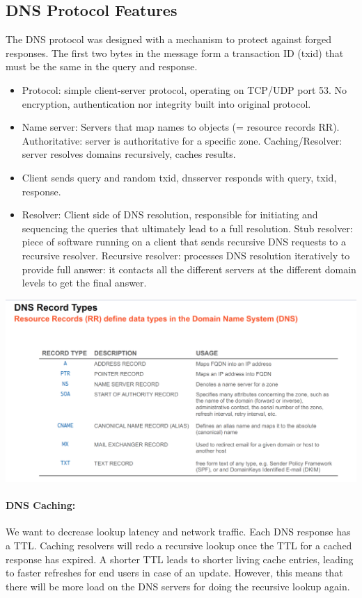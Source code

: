 \subsection{DNS Protocol Features}
The DNS protocol was designed with a mechanism to protect against forged responses. The first two bytes in the message form a transaction ID (txid) that must be the same in the query and response.

\begin{itemize}
	\item Protocol: simple client-server protocol, operating on TCP/UDP port 53. No encryption, authentication nor integrity built into original protocol.
	\item Name server: Servers that map names to objects (= resource records RR). Authoritative: server is authoritative for a specific zone. Caching/Resolver: server resolves domains recursively, caches results.
	\item Client sends query and random txid, dnsserver responds with query, txid, response.
	\item Resolver: Client side of DNS resolution, responsible for initiating and sequencing the queries that ultimately lead to a full resolution. Stub resolver: piece of software running on a client that sends recursive DNS requests to a recursive resolver. Recursive resolver: processes DNS resolution iteratively to	provide full answer: it contacts all the different servers at the different domain levels to get the final answer.
\end{itemize}

\begin{minipage}{\linewidth}
    \centering      
    \includegraphics[width=\linewidth]{Figures/DNS_record_types.PNG} 
\end{minipage}

\paragraph{DNS Caching:}
We want to decrease lookup latency and network traffic. Each DNS response has a TTL. Caching resolvers will redo a recursive lookup once the TTL for a cached response has expired. A shorter TTL leads to shorter living cache entries, leading to faster refreshes for end users in case of an update. However, this means that there will be more load on the DNS servers for doing the recursive lookup again.

